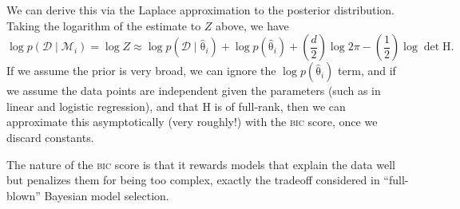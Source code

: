 \documentclass{article}
\newcommand{\acro}[1]{\textsc{\MakeLowercase{#1}}}
\newcommand{\given}{\mid}
\newcommand{\mc}[1]{\mathcal{#1}}
\newcommand{\data}{\mc{D}}
\newcommand{\model}{\mc{M}}
\newcommand{\mat}[1]{\bm{\mathrm{#1}}}
\renewcommand{\vec}[1]{\bm{\mathrm{#1}}}
\begin{document}
We can derive this via the Laplace approximation to the posterior
distribution.  Taking the logarithm of the estimate to $Z$ above, we
have
\begin{equation*}
  \textstyle
  \log p(\data \given \model_i)
  =
  \log Z
  \approx
  \log p(\data \given \hat{\vec{\theta}}_i)
  +
  \log p(\hat{\vec{\theta}}_i)
  +
  (\frac{d}{2}) \log 2\pi
  -
  (\frac{1}{2}) \log \det \mat{H}.
\end{equation*}
If we assume the prior is very broad, we can ignore the $\log
p(\hat{\vec{\theta}}_i)$ term, and if we assume the data points are
independent given the parameters (such as in linear and logistic
regression), and that $\mat{H}$ is of full-rank, then we can
approximate this asymptotically (very roughly!) with the \acro{BIC}
score, once we discard constants.

The nature of the \acro{BIC} score is that it rewards models that
explain the data well but penalizes them for being too complex,
exactly the tradeoff considered in ``full-blown'' Bayesian model
selection.
\end{document}
